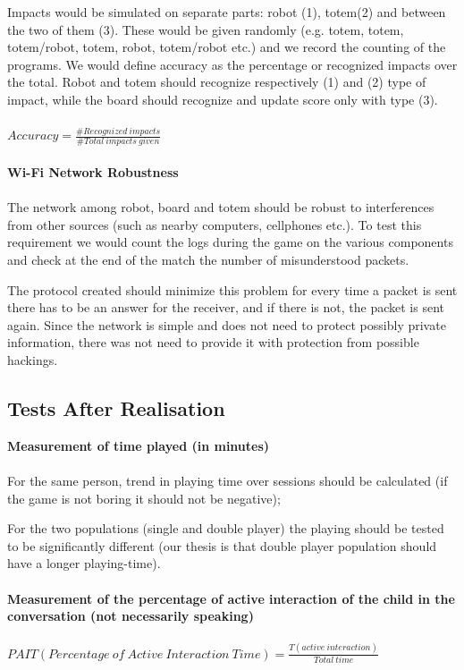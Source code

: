 \documentclass[a4paper,twoside]{book}
\begin{document}
Impacts would be simulated on separate parts: robot (1), totem(2) and between the two of them (3). These would be given randomly (e.g. totem, totem, totem/robot, totem, robot, totem/robot etc.) and we record the counting of the programs. We would define accuracy as the percentage or recognized impacts over the total. Robot and totem should recognize respectively (1) and (2) type of impact, while the board should recognize and update score only with type (3).
\\
\\
$Accuracy=\frac{\#Recognized\ impacts}{\#Total\ impacts\ given}$
\\
\\
\textbf{Wi-Fi Network Robustness}
\\
\\
The network among robot, board and totem should be robust to interferences from other sources (such as nearby computers, cellphones etc.). To test this requirement we would count the logs during the game on the various components and check at the end of the match the number of misunderstood packets. 

The protocol created should minimize this problem for every time a packet is sent there has to be an answer for the receiver, and if there is not, the packet is sent again. Since the network is simple and does not need to protect possibly private information, there was not need to provide it with protection from possible hackings.

\subsection{Tests After Realisation}

\textbf{Measurement of time played (in minutes)}
\\
\\
For the same person, trend in playing time over sessions should be calculated (if the game is not boring it should not be negative);

For the two populations (single and double player) the playing should be tested to be significantly different (our thesis is that double player population should have a longer playing-time).
\\
\\
\textbf{Measurement of the percentage of active interaction of the child in the conversation (not necessarily speaking)}
\\
\\
$PAIT (Percentage\ of\ Active\ Interaction\ Time)=\frac{T(active\ interaction)}{Total\ time}$
\\
\end{document}
